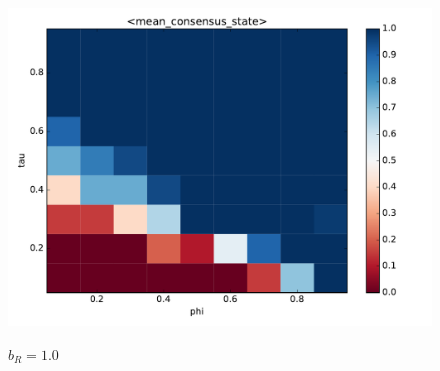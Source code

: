 \begin{minipage}{.55 \textwidth}
	\begin{figure}[H]
		\centering
		\includegraphics[width = \linewidth]{figures/mean_consensus_stateb_r1o0.pdf}
	\end{figure}
\end{minipage}\begin{minipage}{.33 \textwidth}
	\begin{figure}[H]
		\caption{$b_R = 1.0$\label{fig:figB}}
		
	\end{figure}
\end{minipage}
\vspace{-1cm}


